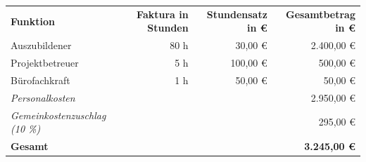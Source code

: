 \begin{tabular}{lrrr}

\rowcolor{heading}\textbf{Funktion} & \textbf{Faktura in Stunden} & \textbf{Stundensatz in €} & \textbf{Gesamtbetrag in €} \\

\rowcolor{odd}Auszubildener & 80 h & 30,00 € & 2.400,00 € \\
Projektbetreuer & 5 h & 100,00 € & 500,00 € \\
\rowcolor{odd}Bürofachkraft & 1 h & 50,00 € & 50,00 € \\
\hline
\hline
\textit{Personalkosten} & ~ & ~ & 2.950,00 € \\
\textit{Gemeinkostenzuschlag (10 \%)} & ~ & ~ & 295,00 € \\
\hline
\hline
\textbf{Gesamt} & ~ & ~ & \textbf{3.245,00 €} \\

\end{tabular}
